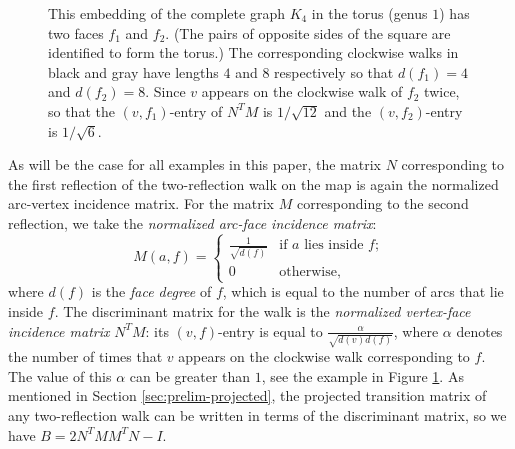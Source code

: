 \documentclass{article}
\numberwithin{equation}{section}
\begin{document}
\begin{figure}
\vspace{-30pt}
\caption{This embedding of the complete graph $K_4$ in the torus (genus $1$) has two faces $f_1$ and $f_2$. (The pairs of opposite sides of the square are identified to form the torus.) The corresponding clockwise walks in black and gray have lengths $4$ and $8$ respectively so that $d(f_1) = 4$ and $d(f_2) = 8$. Since $v$ appears on the clockwise walk of $f_2$ twice, so that the $(v,f_1)$-entry of $N^TM$ is $1/\sqrt{12}$ and the $(v,f_2)$-entry is $1/\sqrt{6}$.
\label{fig:K4_torus_facial_walks}}
\end{figure}
As will be the case for all examples in this paper, the matrix $N$ corresponding to the first reflection of the two-reflection walk on the map is again the normalized arc-vertex incidence matrix. For the matrix $M$ corresponding to the second reflection, we take the \textsl{normalized arc-face incidence matrix}:
\[
M(a,f) = \begin{cases}
\frac{1}{\sqrt{d(f)}} &\text{if $a$ lies inside $f$}; \\
0 &\text{otherwise,}
\end{cases}
\]
where $d(f)$ is the \textsl{face degree} of $f$, which is equal to the number of arcs that lie inside $f$. The discriminant matrix for the walk is the \textsl{normalized vertex-face incidence matrix} $N^TM$: its $(v,f)$-entry is equal to $\frac{\alpha}{\sqrt{d(v)d(f)}}$, where $\alpha$ denotes the number of times that $v$ appears on the clockwise walk corresponding to $f$. The value of this $\alpha$ can be greater than $1$, see the example in Figure \ref{fig:K4_torus_facial_walks}. As mentioned in Section \ref{sec:prelim-projected}, the projected transition matrix of any two-reflection walk can be written in terms of the discriminant matrix, so we have $B = 2N^TMM^TN - I$.
\end{document}
